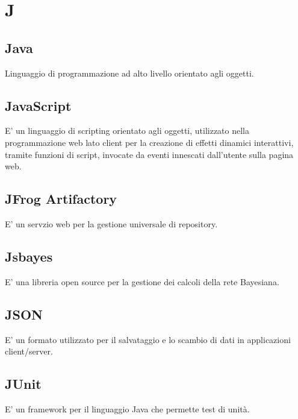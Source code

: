 \section*{J}

\subsection{Java}
Linguaggio di programmazione ad alto livello orientato agli oggetti. 

\subsection{JavaScript}
E' un linguaggio di scripting orientato agli oggetti, utilizzato nella programmazione web lato client per la creazione di effetti dinamici interattivi, tramite funzioni di script, invocate da eventi innescati dall'utente sulla pagina web.

\subsection{JFrog Artifactory} 
E' un servzio web per la gestione universale di repository.

\subsection{Jsbayes}
E' una libreria open source per la gestione dei calcoli della rete Bayesiana.

\subsection{JSON}
E' un formato utilizzato per il salvataggio e lo scambio di dati in applicazioni client/server.

\subsection{JUnit}
E' un framework per il linguaggio Java che permette test di unità.